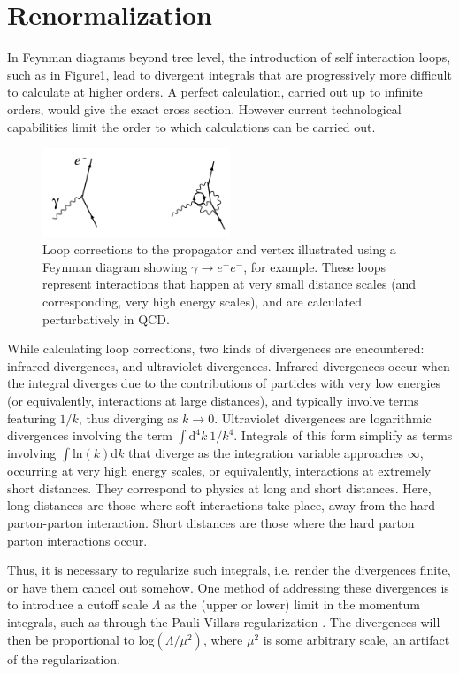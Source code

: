 \documentclass[12pt,a4paper,openright,twoside]{report}
\begin{document}
\section{Renormalization}\label{sec:renorm}
In Feynman diagrams beyond tree level, the introduction of self interaction loops, such as in Figure\ref{fig:loop_corr}, lead to divergent integrals that are progressively more difficult to calculate at higher orders. A perfect calculation, carried out up to infinite orders, would give the exact cross section. However current technological capabilities limit the order to which calculations can be carried out.

\begin{figure}[H]
\centering
\includegraphics[width=0.5\textwidth]{renormalize_diagram.png}
\caption{Loop corrections to the propagator and vertex illustrated using a Feynman diagram showing $\gamma\to e^+e^-$, for example. These loops represent interactions that happen at very small distance scales (and corresponding, very high energy scales), and are calculated perturbatively in QCD.}
\label{fig:loop_corr}
\end{figure}

While calculating loop corrections, two kinds of divergences are encountered: infrared divergences, and ultraviolet divergences. Infrared divergences occur when the integral diverges due to the contributions of particles with very low energies (or equivalently, interactions at large distances), and typically involve terms featuring $1/k$, thus diverging as $k\to 0$. Ultraviolet divergences are logarithmic divergences involving the term $\int \mathrm{d}^4k\ 1/k^4$. Integrals of this form simplify as terms involving $\int \mathrm{ln}(k) \mathrm{d}k$ that diverge as the integration variable approaches $\infty$, occurring at very high energy scales, or equivalently, interactions at extremely short distances. They correspond to physics at long and short distances. Here, long distances are those where soft interactions take place, away from the hard parton-parton interaction. Short distances are those where the hard parton parton interactions occur.

Thus, it is necessary to regularize such integrals, i.e. render the divergences finite, or have them cancel out somehow. One method of addressing these divergences is to introduce a cutoff scale $\Lambda$ as the (upper or lower) limit in the momentum integrals, such as through the Pauli-Villars regularization \cite{Pauli-Villars}. The divergences will then be proportional to log$(\Lambda/\mu^2)$, where $\mu^2$ is some arbitrary scale, an artifact of the regularization.
\end{document}
